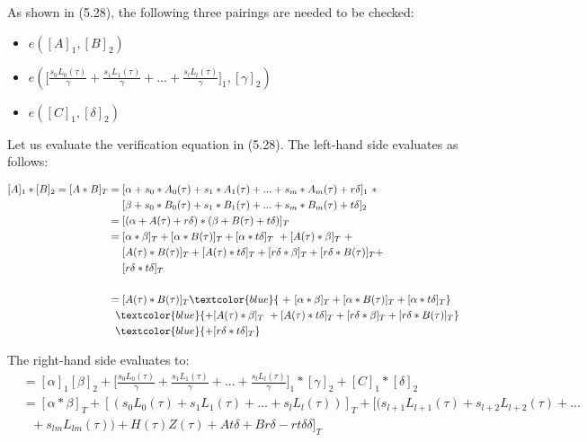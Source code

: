 As shown in (5.28), the following three pairings are needed to be checked:

\begin{itemize}
    \item \(e([A]_1, [B]_2)\)
    \item \begin{math}
        e(\bigl[\frac{s_0L_0(\tau)}{\gamma}+ \frac{s_1L_1(\tau)}{\gamma} + ... + \frac{s_lL_l(\tau)}{\gamma}\bigr]_1 , [\gamma]_2)
    \end{math}
    \item \begin{math}
        e([C]_1, [\delta]_2)
    \end{math}
\end{itemize}

Let us evaluate the verification equation in (5.28). The left-hand side evaluates as follows:

\begin{equation*}
\begin{split}
    [A]_1 * [B]_2 = [A*B]_T &= [\alpha + s_0*A_0(\tau) + s_1*A_1(\tau) + ... + s_m*A_m(\tau) + r\delta]_1 \ *\\
    &\ \ \ \ [\beta + s_0*B_0(\tau) + s_1*B_1(\tau) + ... + s_m*B_m(\tau) + t\delta]_2 \\
    &= [(\alpha + A(\tau) + r\delta) * (\beta + B(\tau) + t\delta)]_T\\
    &= [\alpha * \beta]_T + [\alpha * B(\tau)]_T + [\alpha * t\delta]_T \ + [A(\tau) * \beta]_T \ + \\
    &\ \ \ \ [A(\tau) * B(\tau)]_T + [A(\tau) * t\delta]_T + [r\delta * \beta]_T + [r\delta * B(\tau)]_T +\\
    &\ \ \ \ [r\delta * t\delta]_T \\
    \\
    &= [A(\tau) * B(\tau)]_T \textcolor{blue}{\ +\ [\alpha * \beta]_T + [\alpha * B(\tau)]_T + [\alpha * t\delta]_T} \\
    &\ \ \textcolor{blue}{+ [A(\tau) * \beta]_T \ + [A(\tau) * t\delta]_T + [r\delta * \beta]_T + [r\delta * B(\tau)]_T} \\
    &\ \ \textcolor{blue}{+ [r\delta * t\delta]_T}
\end{split}
\end{equation*}

The right-hand side evaluates to:
 \begin{equation*}
     \begin{split}
    &=[\alpha]_1[\beta]_2 + \bigl[\frac{s_0L_0(\tau)}{\gamma}+ \frac{s_1L_1(\tau)}{\gamma} + ... + \frac{s_lL_l(\tau)}{\gamma}\bigr]_1 * [\gamma]_2 + [C]_1 * [\delta]_2 \\
    &=[\alpha * \beta]_T + [(s_0L_0(\tau) + s_1L_1(\tau) + ... + s_lL_l(\tau))]_T + [(s_{l+1}L_{l+1}(\tau) + s_{l+2}L_{l+2}(\tau) + ... \\
    &\ \ \ + s_{lm}L_{lm}(\tau)) + H(\tau)Z(\tau) + At\delta + Br\delta - rt\delta\delta]_T
     \end{split}
 \end{equation*}

